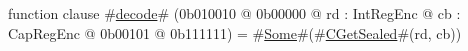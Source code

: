 function clause #\hyperref[sailMIPSzdecode]{decode}# (0b010010 @ 0b00000 @ rd : IntRegEnc @ cb : CapRegEnc @    0b00101 @ 0b111111) = #\hyperref[sailMIPSzSome]{Some}#(#\hyperref[sailMIPSzCGetSealed]{CGetSealed}#(rd, cb))
